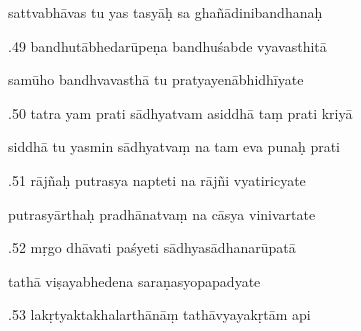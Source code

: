 \documentclass[article,12pt,a4paper]{memoir}%
\newcounter{parCount}
\begin{document}
	  
	  \pstart \leavevmode%
	sattvabhāvas tu yas tasyāḥ sa ghañādinibandhanaḥ 
	{}
	\pend%
      

	  
	  \pstart {}.49 bandhutābhedarūpeṇa bandhuśabde vyavasthitā 
	{}
	\pend%
      

	  
	  \pstart \leavevmode%
	samūho bandhvavasthā tu pratyayenābhidhīyate 
	{}
	\pend%
      

	  
	  \pstart {}.50 tatra yam prati sādhyatvam asiddhā taṃ prati kriyā 
	{}
	\pend%
      

	  
	  \pstart \leavevmode%
	siddhā tu yasmin sādhyatvaṃ na tam eva punaḥ prati 
	{}
	\pend%
      

	  
	  \pstart {}.51 rājñaḥ putrasya napteti na rājñi vyatiricyate 
	{}
	\pend%
      

	  
	  \pstart \leavevmode%
	putrasyārthaḥ pradhānatvaṃ na cāsya vinivartate 
	{}
	\pend%
      

	  
	  \pstart {}.52 mṛgo dhāvati paśyeti sādhyasādhanarūpatā 
	{}
	\pend%
      

	  
	  \pstart \leavevmode%
	tathā viṣayabhedena saraṇasyopapadyate 
	{}
	\pend%
      

	  
	  \pstart {}.53 lakṛtyaktakhalarthānāṃ tathāvyayakṛtām api 
	{}
	\pend%
      
\end{document}
